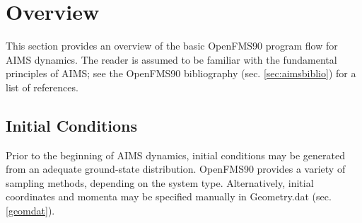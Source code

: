 \documentclass[11pt]{article}
\newcommand\bfec[1]{\textcolor{orange}{\textit{ XXX BFEC: #1 XXX }}}
\renewcommand\dh[1]{\textcolor{purple}{\textit{ DH: #1 }}}
\begin{document}







\newpage \section{Overview}
\label{running} 

This section provides an overview of the basic OpenFMS90 program flow for AIMS dynamics. The reader is assumed to be familiar with the fundamental principles of AIMS; see the OpenFMS90 bibliography (sec. \ref{sec:aimsbiblio}) for a list of references. 


\subsection{Initial Conditions}
\label{initial} 

Prior to the beginning of AIMS dynamics, initial conditions may be generated from an adequate ground-state distribution. OpenFMS90 provides a variety of sampling methods, depending on the system type. Alternatively, initial coordinates and momenta may be specified manually in Geometry.dat (sec. \ref{geomdat}).
\end{document}
